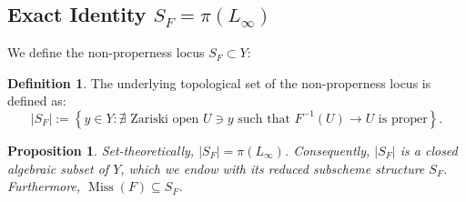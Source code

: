 \documentclass[11pt,reqno]{amsart}
\theoremstyle{plain}
\newtheorem{proposition}[theorem]{Proposition}
\theoremstyle{definition}
\newtheorem{definition}[theorem]{Definition}
\numberwithin{equation}{section}
\DeclareMathOperator{\Miss}{Miss}
\begin{document}
\subsection{Exact Identity \texorpdfstring{$S_F = \pi(L_\infty)$}{SF = pi(L)}}
We define the non-properness locus $S_F \subset Y$:
\begin{definition}\label{def:nonproperness}
The underlying topological set of the non-properness locus is defined as:
\[
|S_F| := \left\{ y \in Y : \nexists \text{ Zariski open } U \ni y \text{ such that } F^{-1}(U) \to U \text{ is proper} \right\}.
\]
\end{definition}

\begin{proposition}\label{prop:boundary-image}
Set-theoretically, $|S_F| = \pi(L_\infty)$. Consequently, $|S_F|$ is a closed algebraic subset of $Y$, which we endow with its reduced subscheme structure $S_F$. Furthermore, $\Miss(F) \subseteq S_F$.
\end{proposition}
\end{document}
